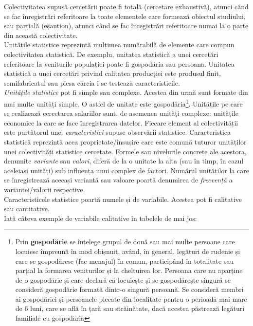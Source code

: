 \documentclass[
  11pt,
  b5paper,
  nottoc]{book}
\begin{document}
Colectivitatea supusă cercetării poate fi totală (cercetare exhaustivă),
atunci când se fac înregistrări referitoare la toate elementele care
formează obiectul studiului, sau parțială (eșantion), atunci când se fac
înregistrări referitoare numai la o parte din această colectivitate.\\
Unitățile statistice reprezintă mulțimea numărabilă de elemente care
compun colectivitatea statistică. De exemplu, unitatea statistică a unei
cercetări referitoare la veniturile populației poate fi gospodăria sau
persoana. Unitatea statistică a unei cercetări privind calitatea
producției este produsul finit, semifabricatul sau piesa căreia i se
testează caracteristicile.\\
\emph{Unitățile statistice} pot fi simple sau complexe. Acestea din urmă
sunt formate din mai multe unități simple. O astfel de unitate este
gospodăria\footnote{Prin \textbf{gospodărie} se înțelege grupul de două
  sau mai multe persoane care locuiesc împreună în mod obișnuit, având,
  în general, legături de rudenie și care se gospodăresc (fac menajul)
  în comun, participând în totalitate sau parțial la formarea
  veniturilor și la cheltuirea lor. Persoana care nu aparține de o
  gospodărie și care declară că locuiește și se gospodărește singură se
  consideră gospodărie formată dintr-o singură persoană. Se consideră
  membri ai gospodăriei și persoanele plecate din localitate pentru o
  perioadă mai mare de 6 luni, care se află în țară sau străinătate,
  dacă acestea păstrează legături familiale cu gospodăria}. Unitățile pe
care se realizează cercetarea salariilor sunt, de asemenea unități
complexe: unitățile economice la care se face înregistrarea datelor.
Fiecare element al colectivității este purtătorul unei
\emph{caracteristici} supuse observării statistice. Caracteristica
statistică reprezintă acea proprietate/însușire care este comună tuturor
unităților unei colectivități statistice cercetate. Formele sau
nivelurile concrete ale acestora, denumite \emph{variante} sau
\emph{valori}, diferă de la o unitate la alta (sau în timp, în cazul
aceleiași unități) sub influența unui complex de factori. Numărul
unităților la care se înregistrează aceeași variantă sau valoare poartă
denumirea de \emph{frecvență} a variantei/valorii respective.\\
Caracteristicele statistice poartă numele și de variabile. Acestea pot
fi calitative sau cantitative.\\
Iată câteva exemple de variabile calitative în tabelele de mai jos:
\end{document}
